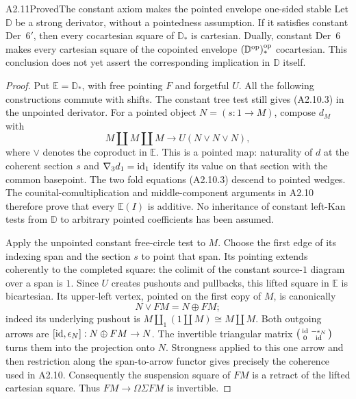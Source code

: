 \begin{claim}{A2.11}{Proved}{The constant axiom makes the pointed envelope one-sided stable}
\label{A2-constant-envelope}
Let $\mathbb D$ be a strong derivator, without a pointedness assumption.
If it satisfies constant Der~$6'$, then every cocartesian square of
$\mathbb D_*$ is cartesian. Dually, constant Der~6 makes every cartesian
square of the copointed envelope $(\mathbb D^{\mathrm{op}})_*^{\mathrm{op}}$ cocartesian.
This conclusion does not yet assert the corresponding implication in
$\mathbb D$ itself.
\end{claim}
\begin{proof}
Put $\mathbb E=\mathbb D_*$, with free pointing $F$ and forgetful $U$.
All the following constructions commute with shifts. The constant tree
test still gives (A2.10.3) in the unpointed derivator. For a pointed
object $N=(s:1\to M)$, compose $d_M$ with
\[
 M\amalg M\amalg M\longrightarrow U(N\vee N\vee N),
 \tag{A2.11.1}
\]
where $\vee$ denotes the coproduct in $\mathbb E$. This is a pointed
map: naturality of $d$ at the coherent section $s$ and
$\nabla_3d_1=\operatorname{id}_1$ identify its value on that section with the common
basepoint. The two fold equations (A2.10.3) descend to pointed wedges.
The counital-comultiplication and middle-component arguments in A2.10
therefore prove that every $\mathbb E(I)$ is additive. No inheritance of
constant left-Kan tests from $\mathbb D$ to arbitrary pointed coefficients
has been assumed.

Apply the unpointed constant free-circle test to $M$. Choose the first
edge of its indexing span and the section $s$ to point that span.
Its pointing extends coherently to the completed square: the colimit of
the constant source-$1$ diagram over a span is $1$. Since $U$ creates
pushouts and pullbacks, this lifted square in $\mathbb E$ is bicartesian.
Its upper-left vertex, pointed on the first copy of $M$, is canonically
\[
 N\vee FM=N\oplus FM;
 \tag{A2.11.2}
\]
indeed its underlying pushout is
$M\amalg_1(1\amalg M)\cong M\amalg M$.
Both outgoing arrows are $[\operatorname{id},\epsilon_N]:N\oplus FM\to N$.
The invertible triangular matrix
$\left(\begin{smallmatrix}\operatorname{id}&-\epsilon_N\\0&\operatorname{id}\end{smallmatrix}\right)$
turns them into the projection onto $N$. Strongness applied to this one
arrow and then restriction along the span-to-arrow functor gives precisely
the coherence used in A2.10. Consequently the suspension square of
$FM$ is a retract of the lifted cartesian square. Thus
$FM\to\Omega\Sigma FM$ is invertible.


\end{proof}
